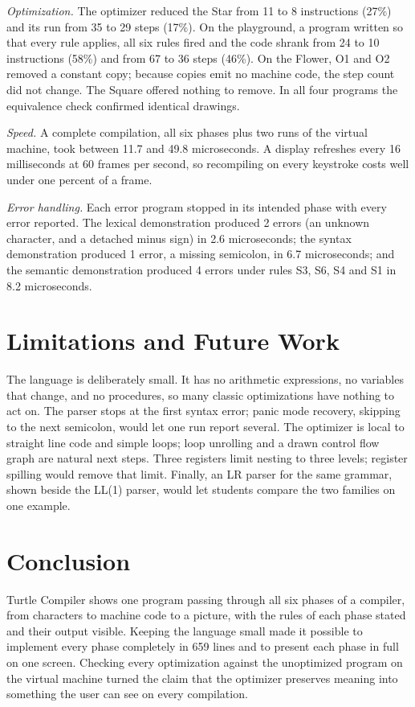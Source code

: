 \documentclass[conference]{IEEEtran}
\begin{document}
\emph{Optimization.} The optimizer reduced the Star from 11 to 8 instructions (27\%) and its run from 35 to 29 steps (17\%). On the playground, a program written so that every rule applies, all six rules fired and the code shrank from 24 to 10 instructions (58\%) and from 67 to 36 steps (46\%). On the Flower, O1 and O2 removed a constant copy; because copies emit no machine code, the step count did not change. The Square offered nothing to remove. In all four programs the equivalence check confirmed identical drawings.

\emph{Speed.} A complete compilation, all six phases plus two runs of the virtual machine, took between 11.7 and 49.8 microseconds. A display refreshes every 16 milliseconds at 60 frames per second, so recompiling on every keystroke costs well under one percent of a frame.

\emph{Error handling.} Each error program stopped in its intended phase with every error reported. The lexical demonstration produced 2 errors (an unknown character, and a detached minus sign) in 2.6 microseconds; the syntax demonstration produced 1 error, a missing semicolon, in 6.7 microseconds; and the semantic demonstration produced 4 errors under rules S3, S6, S4 and S1 in 8.2 microseconds.

\section{Limitations and Future Work}

The language is deliberately small. It has no arithmetic expressions, no variables that change, and no procedures, so many classic optimizations have nothing to act on. The parser stops at the first syntax error; panic mode recovery, skipping to the next semicolon, would let one run report several. The optimizer is local to straight line code and simple loops; loop unrolling and a drawn control flow graph are natural next steps. Three registers limit nesting to three levels; register spilling would remove that limit. Finally, an LR parser for the same grammar, shown beside the LL(1) parser, would let students compare the two families on one example.

\section{Conclusion}

Turtle Compiler shows one program passing through all six phases of a compiler, from characters to machine code to a picture, with the rules of each phase stated and their output visible. Keeping the language small made it possible to implement every phase completely in 659 lines and to present each phase in full on one screen. Checking every optimization against the unoptimized program on the virtual machine turned the claim that the optimizer preserves meaning into something the user can see on every compilation.
\end{document}
